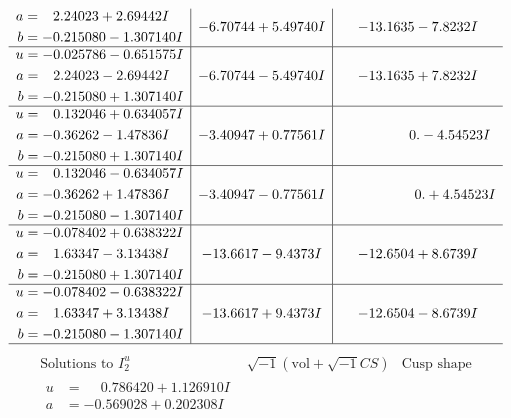 \documentclass[1p]{elsarticle_modified}
\theoremstyle{definition}
\newcommand{\I}{\sqrt{-1}}
\begin{document}
$$\begin{array}{c|c|c}
\begin{aligned}
a &= \phantom{-}2.24023 + 2.69442 I \\
b &= -0.215080 - 1.307140 I\end{aligned}
 & -6.70744 + 5.49740 I & -13.1635 - 7.8232 I \\ \hline\begin{aligned}
u &= -0.025786 - 0.651575 I \\
a &= \phantom{-}2.24023 - 2.69442 I \\
b &= -0.215080 + 1.307140 I\end{aligned}
 & -6.70744 - 5.49740 I & -13.1635 + 7.8232 I \\ \hline\begin{aligned}
u &= \phantom{-}0.132046 + 0.634057 I \\
a &= -0.36262 - 1.47836 I \\
b &= -0.215080 + 1.307140 I\end{aligned}
 & -3.40947 + 0.77561 I & \phantom{-0.000000 } 0. - 4.54523 I \\ \hline\begin{aligned}
u &= \phantom{-}0.132046 - 0.634057 I \\
a &= -0.36262 + 1.47836 I \\
b &= -0.215080 - 1.307140 I\end{aligned}
 & -3.40947 - 0.77561 I & \phantom{-0.000000 -}0. + 4.54523 I \\ \hline\begin{aligned}
u &= -0.078402 + 0.638322 I \\
a &= \phantom{-}1.63347 - 3.13438 I \\
b &= -0.215080 + 1.307140 I\end{aligned}
 & -13.6617 - 9.4373 I & -12.6504 + 8.6739 I \\ \hline\begin{aligned}
u &= -0.078402 - 0.638322 I \\
a &= \phantom{-}1.63347 + 3.13438 I \\
b &= -0.215080 - 1.307140 I\end{aligned}
 & -13.6617 + 9.4373 I & -12.6504 - 8.6739 I\\
 \hline 
 \end{array}$$\newpage$$\begin{array}{c|c|c}  
\text{Solutions to }I^u_{2}& \I (\text{vol} + \sqrt{-1}CS) & \text{Cusp shape}\\
 \hline 
\begin{aligned}
u &= \phantom{-}0.786420 + 1.126910 I \\
a &= -0.569028 + 0.202308 I \\

\end{aligned}
\end{array}$$
\end{document}
